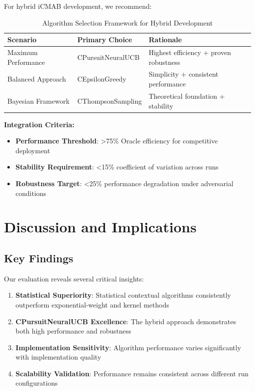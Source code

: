 \documentclass[12pt,a4paper]{article}
\newcommand{\primarytext}[1]{\textcolor{primaryblue}{\textbf{#1}}}
\newcommand{\secondarytext}[1]{\textcolor{secondaryblue}{\textbf{#1}}}
\newcommand{\success}[1]{\textcolor{accentgreen}{\textbf{#1}}}
\begin{document}
For hybrid iCMAB development, we recommend:

\begin{table}[H]
\centering
\caption{Algorithm Selection Framework for Hybrid Development}
\begin{tabular}{@{}lll@{}}
\toprule
\textbf{Scenario} & \textbf{Primary Choice} & \textbf{Rationale} \\
\midrule
Maximum Performance & CPursuitNeuralUCB & Highest efficiency + proven robustness \\
Balanced Approach & CEpsilonGreedy & Simplicity + consistent performance \\
Bayesian Framework & CThompsonSampling & Theoretical foundation + stability \\
\bottomrule
\end{tabular}
\end{table}

\textbf{Integration Criteria:}
\begin{itemize}
\item \textbf{Performance Threshold}: >75\% Oracle efficiency for competitive deployment
\item \textbf{Stability Requirement}: <15\% coefficient of variation across runs
\item \textbf{Robustness Target}: <25\% performance degradation under adversarial conditions
\end{itemize}

\section{Discussion and Implications}

\subsection{Key Findings}

Our evaluation reveals several critical insights:

\begin{enumerate}
\item \primarytext{Statistical Superiority}: Statistical contextual algorithms consistently outperform exponential-weight and kernel methods
\item \success{CPursuitNeuralUCB Excellence}: The hybrid approach demonstrates both high performance and robustness
\item \secondarytext{Implementation Sensitivity}: Algorithm performance varies significantly with implementation quality
\item \textbf{Scalability Validation}: Performance remains consistent across different run configurations
\end{enumerate}
\end{document}
